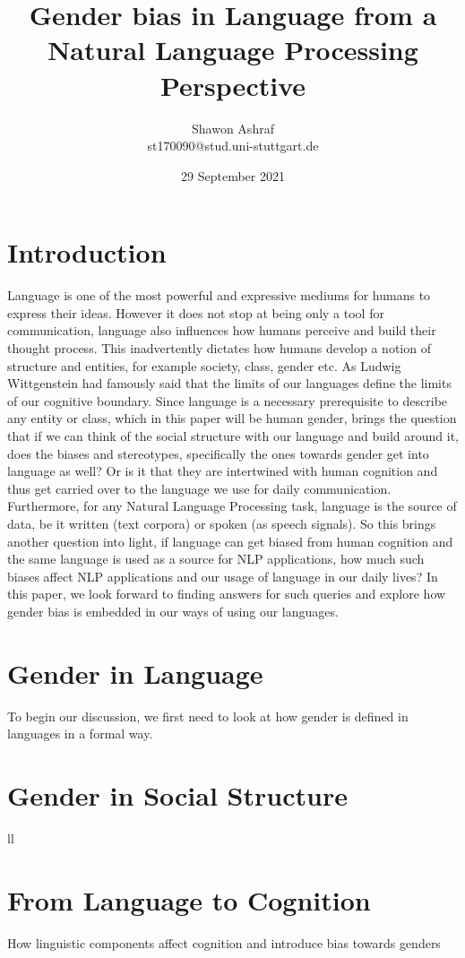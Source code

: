 \documentclass{article}
\title{Gender bias in Language from a Natural Language Processing Perspective}
\author{Shawon Ashraf \\ st170090@stud.uni-stuttgart.de}
\date{29 September 2021}
\begin{document}
\section{Introduction}
Language is one of the most powerful and expressive mediums for humans to express their ideas. However it does not stop at being only a tool for communication, language also influences how humans perceive and build their thought process. This inadvertently dictates how humans develop a notion of structure and entities, for example society, class, gender etc. As Ludwig Wittgenstein had famously said that the limits of our languages define the limits of our cognitive boundary. Since language is a necessary prerequisite to describe any entity or class, which in this paper will be human gender, brings the question that if we can think of the social structure with our language and build around it, does the biases and stereotypes, specifically the ones towards gender get into language as well? Or is it that they are intertwined with human cognition and thus get carried over to the language we use for daily communication. Furthermore, for any Natural Language Processing task, language is the source of data, be it written (text corpora) or spoken (as speech signals). So this brings another question into light, if language can get biased from human cognition and the same language is used as a source for NLP applications, how much such biases affect NLP applications and our usage of language in our daily lives? In this paper, we look forward to finding answers for such queries and explore how gender bias is embedded in our ways of using our languages.

\section{Gender in Language}
To begin our discussion, we first need to look at how gender is defined in languages in a formal way. 

\section{Gender in Social Structure}
ll

\section{From Language to Cognition}
How linguistic components affect cognition and introduce bias towards genders
\end{document}
